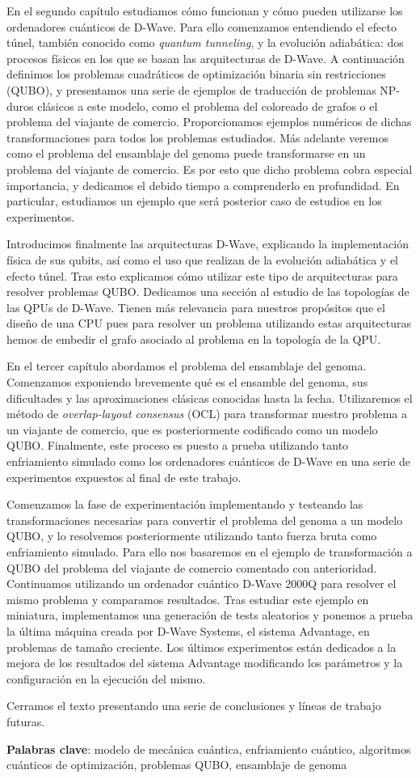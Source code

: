 En el segundo capítulo estudiamos cómo funcionan y cómo pueden utilizarse los ordenadores cuánticos de D-Wave. Para ello comenzamos entendiendo el efecto túnel, también conocido como \emph{quantum tunneling}, y la evolución adiabática: dos procesos físicos en los que se basan las arquitecturas de D-Wave. A continuación definimos los problemas cuadráticos de optimización binaria sin restricciones (QUBO), y presentamos una serie de ejemplos de traducción de problemas NP-duros clásicos a este modelo, como el problema del coloreado de grafos o el problema del viajante de comercio. Proporcionamos ejemplos numéricos de dichas transformaciones para todos los problemas estudiados. Más adelante veremos como el problema del ensamblaje del genoma puede transformarse en un problema del viajante de comercio. Es por esto que dicho problema cobra especial importancia, y dedicamos el debido tiempo a comprenderlo en profundidad. En particular, estudiamos un ejemplo que será posterior caso de estudios en los experimentos.

Introducimos finalmente las arquitecturas D-Wave, explicando la implementación física de sus qubits, así como el uso que realizan de la evolución adiabática y el efecto túnel. Tras esto explicamos cómo utilizar este tipo de arquitecturas para resolver problemas QUBO. Dedicamos una sección al estudio de las topologías de las QPUs de D-Wave. Tienen más relevancia para nuestros propósitos que el diseño de una CPU pues para resolver un problema utilizando estas arquitecturas hemos de embedir el grafo asociado al problema en la topología de la QPU.

En el tercer capítulo abordamos el problema del ensamblaje del genoma. Comenzamos exponiendo brevemente qué es el ensamble del genoma, sus dificultades y las aproximaciones clásicas conocidas hasta la fecha. Utilizaremos el método de \emph{overlap-layout consensus} (OCL) para transformar nuestro problema a un viajante de comercio, que es posteriormente codificado como un modelo QUBO. Finalmente, este proceso es puesto a prueba utilizando tanto enfriamiento simulado como los ordenadores cuánticos de D-Wave en una serie de experimentos expuestos al final de este trabajo. 

Comenzamos la fase de experimentación implementando y testeando las transformaciones necesarias para convertir el problema del genoma a un modelo QUBO, y lo resolvemos posteriormente utilizando tanto fuerza bruta como enfriamiento simulado. Para ello nos basaremos en el ejemplo de transformación a QUBO del problema del viajante de comercio comentado con anterioridad. Continuamos utilizando un ordenador cuántico D-Wave 2000Q para resolver el mismo problema y comparamos resultados. Tras estudiar este ejemplo en miniatura, implementamos una generación de tests aleatorios y ponemos a prueba la última máquina creada por D-Wave Systems, el sistema Advantage, en problemas de tamaño creciente. Los últimos experimentos están dedicados a la mejora de los resultados del sistema Advantage modificando los parámetros y la configuración en la ejecución del mismo.

Cerramos el texto presentando una serie de conclusiones y líneas de trabajo futuras.

\textbf{Palabras clave}: modelo de mecánica cuántica, enfriamiento cuántico, algoritmos cuánticos de optimización, problemas QUBO, ensamblaje de genoma